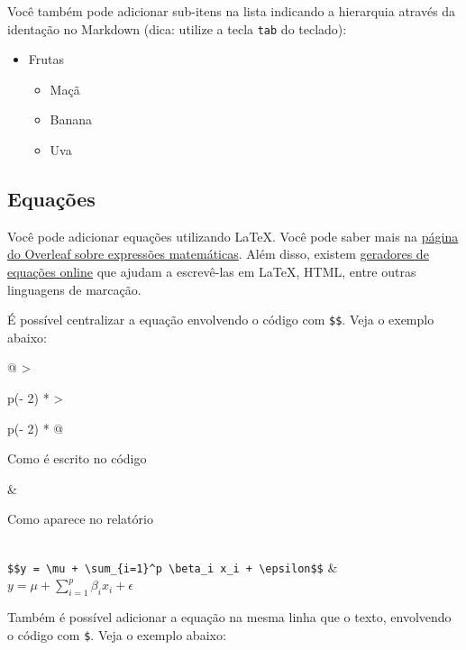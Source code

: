 \documentclass[
]{book}
\providecommand{\tightlist}{%
  \setlength{\itemsep}{0pt}\setlength{\parskip}{0pt}}
\begin{document}
Você também pode adicionar sub-itens na lista indicando a hierarquia através da identação no Markdown (dica: utilize a tecla \texttt{tab} do teclado):

\begin{itemize}
\tightlist
\item
  Frutas

  \begin{itemize}
  \tightlist
  \item
    Maçã
  \item
    Banana
  \item
    Uva
  \end{itemize}
\end{itemize}

\subsection{Equações}\label{equauxe7uxf5es}

Você pode adicionar equações utilizando LaTeX. Você pode saber mais na \href{https://pt.overleaf.com/learn/latex/Mathematical_expressions}{página do Overleaf sobre expressões matemáticas}. Além disso, existem \href{https://www.codecogs.com/latex/eqneditor.php}{geradores de equações online} que ajudam a escrevê-las em LaTeX, HTML, entre outras linguagens de marcação.

É possível centralizar a equação envolvendo o código com \texttt{\$\$}. Veja o exemplo abaixo:

\begin{longtable}[]{@{}
  >{\raggedright\arraybackslash}p{(\columnwidth - 2\tabcolsep) * }
  >{\raggedright\arraybackslash}p{(\columnwidth - 2\tabcolsep) * }@{}}
\toprule\noalign{}
\begin{minipage}[b]{\linewidth}\raggedright
Como é escrito no código
\end{minipage} & \begin{minipage}[b]{\linewidth}\raggedright
Como aparece no relatório
\end{minipage} \\
\midrule\noalign{}
\endhead
\bottomrule\noalign{}
\endlastfoot
\texttt{\$\$y\ =\ \textbackslash{}mu\ +\ \textbackslash{}sum\_\{i=1\}\^{}p\ \textbackslash{}beta\_i\ x\_i\ +\ \textbackslash{}epsilon\$\$} & \(y = \mu + \sum_{i=1}^p \beta_i x_i + \epsilon\) \\
\end{longtable}

Também é possível adicionar a equação na mesma linha que o texto, envolvendo o código com \texttt{\$}. Veja o exemplo abaixo:
\end{document}
